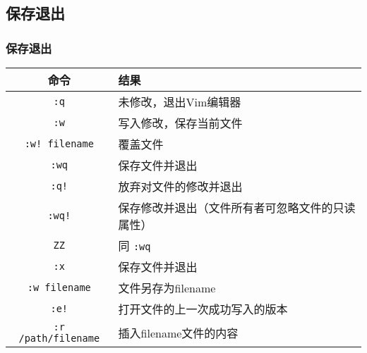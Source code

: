 \subsection{保存退出}
\begin{frame}
  \frametitle{\alert{保存退出}}
  \begin{table}
    \centering
    \begin{tabularx}{\textwidth}{cX}
      \hline
      \rowcolor{blue!50}命令 & 结果\\
      \hline
      \verb|:q| & 未修改，退出Vim编辑器\\
      \verb|:w| & 写入修改，保存当前文件\\
      \verb|:w! filename| & 覆盖文件\\
      \verb|:wq| & 保存文件并退出\\
      \verb|:q!| & 放弃对文件的修改并退出\\
      \verb|:wq!| & 保存修改并退出（文件所有者可忽略文件的只读属性）\\
      \verb|ZZ| & 同 \verb|:wq|\\
      \verb|:x| & 保存文件并退出\\
      \verb|:w filename| & 文件另存为filename\\
      \verb|:e!| & 打开文件的上一次成功写入的版本\\
      \verb|:r /path/filename| & 插入filename文件的内容\\
      \hline
    \end{tabularx}
  \end{table}
\end{frame}

